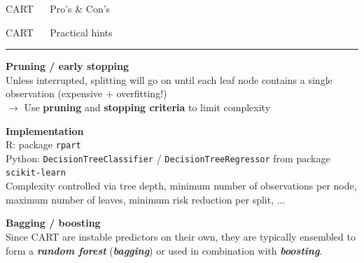 \documentclass[11pt,compress,t,notes=noshow, xcolor=table]{beamer}
\begin{document}
\begin{frame}{\textcolor{gray!80}{CART} ~~ Pro's \& Con's}
\vfill

\small


\end{frame}


\LARGE
\begin{frame}{\textcolor{gray!80}{CART} ~~ Practical hints}
\normalsize
\vspace{-0.5cm}
\noindent \textcolor{gray!80}{\rule{\textwidth}{1pt}}

\vspace{0.3cm}

\footnotesize

\textbf{\textcolor{gray!80}{Pruning / early stopping}} \\
\smallskip
Unless interrupted, splitting will go on until each leaf node contains a single 
observation (expensive + overfitting!) \\
\smallskip
$\rightarrow$ Use \textbf{pruning} and \textbf{stopping criteria} to limit 
complexity

\lz
\textbf{\textcolor{gray!80}{Implementation}} \\
\smallskip
R: package \texttt{rpart}\\
Python: \texttt{DecisionTreeClassifier} / \texttt{DecisionTreeRegressor} from 
package \texttt{scikit-learn} \\
Complexity controlled via tree depth, minimum number of observations per 
node, maximum number of leaves, minimum risk reduction per split, ...

\lz
\textbf{\textcolor{gray!80}{Bagging / boosting}} \\
\smallskip
Since CART are instable predictors on their own, they are typically ensembled
to form a \textit{\textbf{random forest}} (\textit{\textbf{bagging}}) or used in 
combination with \textit{\textbf{boosting}}.

\end{frame}

\end{document}
